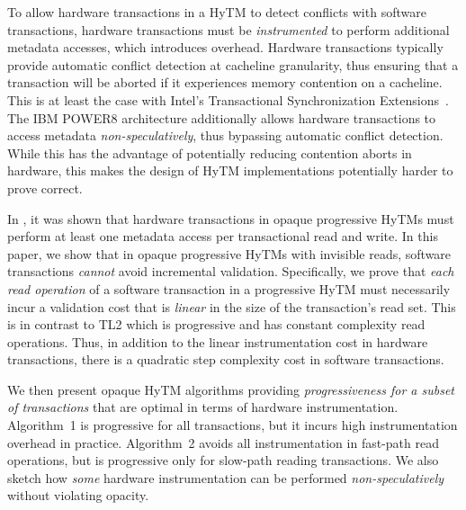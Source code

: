 To allow hardware transactions in a HyTM to detect conflicts with software transactions, hardware transactions must be \emph{instrumented} to perform additional metadata accesses, which introduces overhead.
Hardware transactions typically provide automatic conflict detection at cacheline granularity,
thus ensuring that a transaction will be aborted if it experiences memory contention on a cacheline.
This is at least the case with Intel's Transactional Synchronization Extensions~\cite{haswell}.
The IBM POWER8 architecture additionally allows hardware transactions to access metadata \emph{non-speculatively}, 
thus bypassing automatic conflict detection. While this has the advantage of potentially reducing contention aborts
in hardware, this makes the design of HyTM implementations potentially harder to prove correct.

In \cite{hytm14disc}, it was shown that hardware transactions in opaque progressive HyTMs must perform
at least one metadata access per transactional read and write.
In this paper, we show that in opaque progressive HyTMs with invisible reads, 
software transactions \textit{cannot} avoid incremental validation.
Specifically, we prove that \textit{each read operation} of a software transaction in a progressive HyTM
must necessarily incur a validation cost that is \emph{linear} 
in the size of the transaction's read set. 
This is in contrast to TL2 which is progressive and has constant complexity read operations.
Thus, in addition to the linear instrumentation cost in hardware transactions, there is a quadratic step complexity cost in software transactions.

We then present opaque HyTM algorithms providing \emph{progressiveness for a subset of transactions} that are  %
optimal in terms of hardware instrumentation.
Algorithm~1 is progressive for all transactions, but it incurs high instrumentation overhead in practice.
Algorithm~2 avoids all instrumentation in fast-path read operations, but is progressive only for slow-path reading transactions.
We also sketch how \emph{some} hardware instrumentation can be performed \textit{non-speculatively} without violating opacity.

